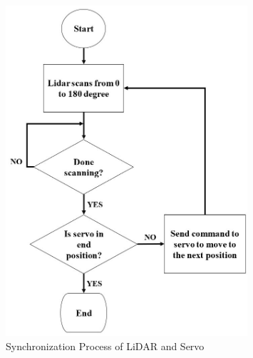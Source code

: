 \begin{figure}[H]
	\centering
	\includegraphics[width=0.8\textwidth, height=0.9\textwidth]{Figures/lidar_servo_sync}
	\caption{Synchronization Process of LiDAR and Servo}
	\label{ch3:fig:scan_and_movement_direction}
\end{figure}




